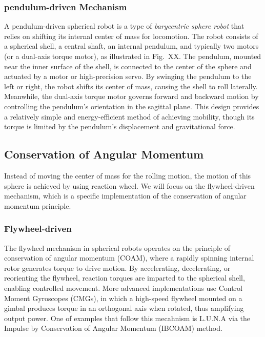 \documentclass[english, bachelor, utf8]{base/thesis_telematics}
\begin{document}
\subsubsection{pendulum-driven Mechanism}
A pendulum-driven spherical robot is a type of \textit{barycentric sphere robot} that relies on shifting its internal center of mass for locomotion. 
The robot consists of a spherical shell, a central shaft, an internal pendulum, and typically two motors (or a dual-axis torque motor), as illustrated in Fig.~XX. 
The pendulum, mounted near the inner surface of the shell, is connected to the center of the sphere and actuated by a motor or high-precision servo. 
By swinging the pendulum to the left or right, the robot shifts its center of mass, causing the shell to roll laterally. 
Meanwhile, the dual-axis torque motor governs forward and backward motion by controlling the pendulum’s orientation in the sagittal plane. 
This design provides a relatively simple and energy-efficient method of achieving mobility, though its torque is limited by the pendulum’s displacement and gravitational force.\cite{pendulum_sphere,Pendulum_Driven_Spherical_Robot,roboball}


\subsection{Conservation of Angular Momentum}
Instead of moving the center of mass for the rolling motion, the motion of this sphere is achieved by using reaction wheel. 
We will focus on the flywheel-driven mechanism, which is a specific implementation of the conservation of angular momentum principle.\cite{Aminata}
\subsubsection{Flywheel-driven}
The flywheel mechanism in spherical robots operates on the principle of conservation of angular momentum (COAM), where a rapidly spinning internal rotor generates torque to drive motion. By accelerating, decelerating, or reorienting the flywheel, reaction torques are imparted to the spherical shell, enabling controlled movement.
More advanced implementations use Control Moment Gyroscopes (CMGs), in which a high-speed flywheel mounted on a gimbal produces torque in an orthogonal axis when rotated, thus amplifying output power.
One of examples that follow this mecahnism is L.U.N.A\cite{luna} via the Impulse by Conservation of Angular Momentum (IBCOAM) method.
\end{document}
